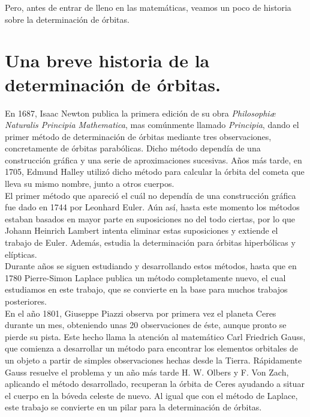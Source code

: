 \documentclass[11pt]{book}
\begin{document}
Pero, antes de entrar de lleno en las matemáticas, veamos un poco de historia sobre la determinación de órbitas.\\


\section{Una breve historia de la determinación de órbitas.}
\label{sec:history}
En 1687, Isaac Newton publica la primera edición de su obra \textit{Philosophiæ Naturalis Principia Mathematica}, mas comúnmente llamado \textit{Principia}, dando el primer método de determinación de órbitas mediante tres observaciones, concretamente de órbitas parabólicas. Dicho método dependía de una construcción gráfica y una serie de aproximaciones sucesivas. Años más tarde, en 1705, Edmund Halley utilizó dicho método para calcular la órbita del cometa que lleva su mismo nombre, junto a otros cuerpos.\\

El primer método que apareció el cuál no dependía de una construcción gráfica fue dado en 1744 por Leonhard Euler. Aún así, hasta este momento los métodos estaban basados en mayor parte en suposiciones no del todo ciertas, por lo que Johann Heinrich Lambert intenta eliminar estas suposiciones y extiende el trabajo de Euler. Además, estudia la determinación para órbitas hiperbólicas y elípticas.\\

Durante años se siguen estudiando y desarrollando estos métodos, hasta que en 1780 Pierre-Simon Laplace publica un método completamente nuevo, el cual estudiamos en este trabajo, que se convierte en la base para muchos trabajos posteriores.\\

En el año 1801, Giuseppe Piazzi observa por primera vez el planeta Ceres durante un mes, obteniendo unas 20 observaciones de éste, aunque pronto se pierde su pista. Este hecho llama la atención al matemático Carl Friedrich Gauss, que comienza a desarrollar un método para encontrar los elementos orbitales de un objeto a partir de simples observaciones hechas desde la Tierra. Rápidamente Gauss resuelve el problema y un año más tarde H. W. Olbers y F. Von Zach, aplicando el método desarrollado, recuperan la órbita de Ceres ayudando a situar el cuerpo en la bóveda celeste de nuevo. Al igual que con el método de Laplace, este trabajo se convierte en un pilar para la determinación de órbitas.\\
\end{document}
